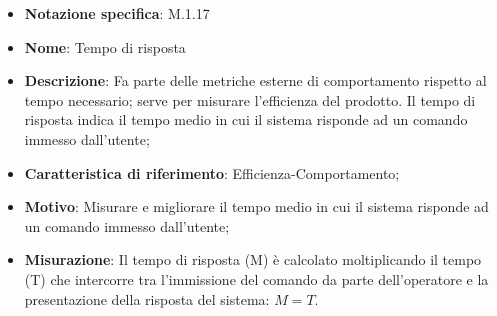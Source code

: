 \begin{itemize}
    \item \textbf{Notazione specifica}: M.1.17
    \item \textbf{Nome}: Tempo di risposta
    \item \textbf{Descrizione}: Fa parte delle metriche esterne di comportamento rispetto al tempo necessario; serve per misurare l’efficienza del prodotto. Il tempo di risposta indica il tempo medio in cui il sistema risponde ad un comando immesso dall’utente;
    \item \textbf{Caratteristica di riferimento}: Efficienza-Comportamento;
    \item \textbf{Motivo}: Misurare e migliorare il tempo medio in cui il sistema risponde ad un comando immesso dall’utente;
    \item \textbf{Misurazione}: Il tempo di risposta (M) è calcolato moltiplicando il tempo (T) che intercorre tra l’immissione del comando da parte dell’operatore e la presentazione della risposta del sistema: \( M = T \).
\end{itemize}
